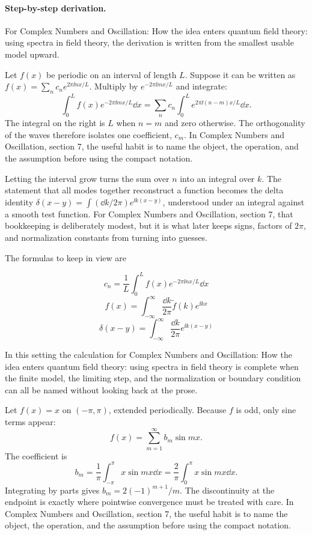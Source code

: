 \paragraph{Step-by-step derivation.}

For Complex Numbers and Oscillation: How the idea enters quantum field theory: using spectra in field theory, the derivation is written from the smallest usable model upward.

Let \(f(x)\) be periodic on an interval of length \(L\).  Suppose it can be written as \(f(x)=\sum_n c_ne^{2\pi\ii nx/L}\).  Multiply by \(e^{-2\pi\ii mx/L}\) and integrate:
\[
  \int_0^L f(x)e^{-2\pi\ii mx/L}\dd x
  =
  \sum_n c_n\int_0^L e^{2\pi\ii(n-m)x/L}\dd x.
\]
The integral on the right is \(L\) when \(n=m\) and zero otherwise.  The orthogonality of the waves therefore isolates one coefficient, \(c_m\).  In Complex Numbers and Oscillation, section 7, the useful habit is to name the object, the operation, and the assumption before using the compact notation.

Letting the interval grow turns the sum over \(n\) into an integral over \(k\).  The statement that all modes together reconstruct a function becomes the delta identity \(\delta(x-y)=\int(\dd k/2\pi)e^{\ii k(x-y)}\), understood under an integral against a smooth test function.  For Complex Numbers and Oscillation, section 7, that bookkeeping is deliberately modest, but it is what later keeps signs, factors of \(2\pi\), and normalization constants from turning into guesses.

The formulas to keep in view are

\[
  c_n=\frac1L\int_0^L f(x)e^{-2\pi\ii nx/L}\dd x
\]
\[
  f(x)=\int_{-\infty}^{\infty}\frac{\dd k}{2\pi}\tilde f(k)e^{\ii kx}
\]
\[
  \delta(x-y)=\int_{-\infty}^{\infty}\frac{\dd k}{2\pi}e^{\ii k(x-y)}
\]

In this setting the calculation for Complex Numbers and Oscillation: How the idea enters quantum field theory: using spectra in field theory is complete when the finite model, the limiting step, and the normalization or boundary condition can all be named without looking back at the prose.




\begin{example}
Let \(f(x)=x\) on \((-\pi,\pi)\), extended periodically.  Because \(f\) is odd, only sine terms appear:
\[
  f(x)=\sum_{m=1}^\infty b_m\sin mx.
\]
The coefficient is
\[
  b_m=\frac1\pi\int_{-\pi}^\pi x\sin mx\dd x
  =\frac2\pi\int_0^\pi x\sin mx\dd x.
\]
Integrating by parts gives \(b_m=2(-1)^{m+1}/m\).  The discontinuity at the endpoint is exactly where pointwise convergence must be treated with care.  In Complex Numbers and Oscillation, section 7, the useful habit is to name the object, the operation, and the assumption before using the compact notation.
\end{example}




